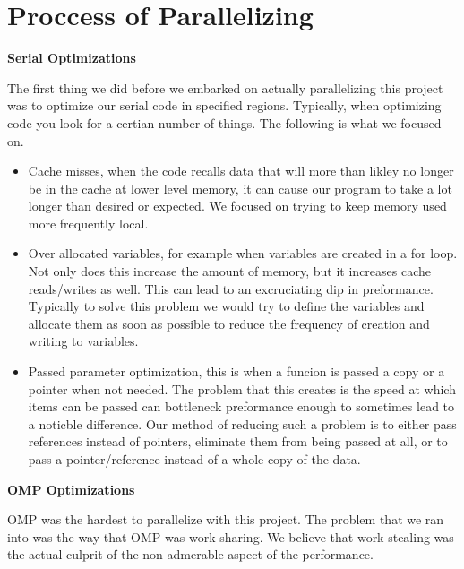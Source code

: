\chapter*{Proccess of Parallelizing}

\begin{center}
    \Large\textbf{Serial Optimizations}\\
\end{center}
    The first thing we did before we embarked on actually parallelizing this project was to optimize our serial code in specified regions. Typically, when optimizing code you look for a certian number of things. The following is what we focused on. 

\begin{itemize}
    \item Cache misses, when the code recalls data that will more than likley no longer be in the cache at lower level memory, it can cause our program to take a lot longer than desired or expected. We focused on trying to keep memory used more frequently local.  
    \item Over allocated variables, for example when variables are created in a for loop. Not only does this increase the amount of memory, but it increases cache reads/writes as well. This can lead to an excruciating dip in preformance. Typically to solve this problem we would try to define the variables and allocate them as soon as possible to reduce the frequency of creation and writing to variables.
    \item Passed parameter optimization, this is when a funcion is passed a copy or a pointer when not needed. The problem that this creates is the speed at which items can be passed can bottleneck preformance enough to sometimes lead to a noticble difference. Our method of reducing such a problem is to either pass references instead of pointers, eliminate them from being passed at all, or to pass a pointer/reference instead of a whole copy of the data.
\end{itemize}


\begin{center}
    \Large\textbf{OMP Optimizations}\\
\end{center}

    OMP was the hardest to parallelize with this project. The problem that we ran into was the way that OMP was work-sharing. We believe that work stealing was the actual culprit of the non admerable aspect of the performance.

